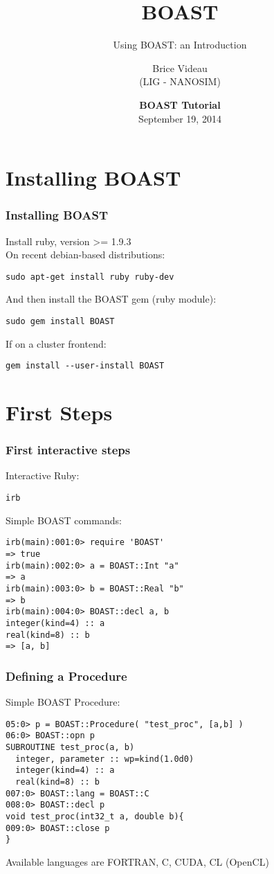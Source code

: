 \documentclass{beamer}
\title{BOAST}
\subtitle{Using BOAST: an Introduction }
\author{Brice Videau\\
(LIG - NANOSIM)}
\date{\textbf{BOAST Tutorial}\\September 19, 2014}
\begin{document}
\frame{\titlepage}

\section{Installing BOAST}


\begin{frame}[fragile]

    \frametitle{Installing BOAST}

Install ruby, version >= 1.9.3\\
On recent debian-based distributions:
\begin{lstlisting}
sudo apt-get install ruby ruby-dev
\end{lstlisting}
And then install the BOAST gem (ruby module):
\begin{lstlisting}
sudo gem install BOAST
\end{lstlisting}
If on a cluster frontend:
\begin{lstlisting}
gem install --user-install BOAST
\end{lstlisting}

\end{frame}

\section{First Steps}

\begin{frame}[fragile]
\frametitle{First interactive steps}
Interactive Ruby:
\begin{lstlisting}
irb
\end{lstlisting}
Simple BOAST commands:
\lstset{style=BOAST}
\begin{lstlisting}
irb(main):001:0> require 'BOAST'
=> true
irb(main):002:0> a = BOAST::Int "a"
=> a
irb(main):003:0> b = BOAST::Real "b"
=> b
irb(main):004:0> BOAST::decl a, b
integer(kind=4) :: a
real(kind=8) :: b
=> [a, b]
\end{lstlisting}
\end{frame}

\begin{frame}[fragile]
\frametitle{Defining a Procedure}
Simple BOAST Procedure:
\lstset{style=BOAST}
\footnotesize
\begin{lstlisting}
05:0> p = BOAST::Procedure( "test_proc", [a,b] )
06:0> BOAST::opn p
SUBROUTINE test_proc(a, b)
  integer, parameter :: wp=kind(1.0d0)
  integer(kind=4) :: a
  real(kind=8) :: b
007:0> BOAST::lang = BOAST::C
008:0> BOAST::decl p
void test_proc(int32_t a, double b){
009:0> BOAST::close p
}
\end{lstlisting}
Available languages are FORTRAN, C, CUDA, CL (OpenCL)
\end{frame}
\end{document}
